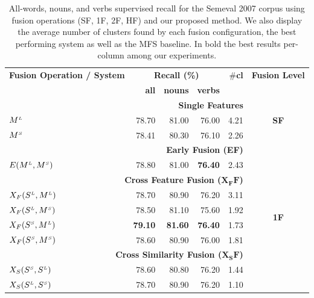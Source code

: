 \begin{table}[htp!]
\centering
\caption{All-words, nouns, and verbs supervised recall for the Semeval 2007 corpus using fusion operations (SF, 1F, 2F, HF) and our proposed method. We also display the average number of clusters found by each fusion configuration, the best performing system as well as the MFS baseline. In bold the best results per-column among our experiments.}
\label{tab:sem2007_PM_Recall}
\begin{tabular}{@{}lrrrrc@{}}
\toprule
\textbf{Fusion Operation / System} & \multicolumn{3}{c}{\textbf{Recall (\%)}} & \#\textbf{cl} & \textbf{Fusion Level}\\ 
        & \textbf{all}          & \textbf{nouns}          & \textbf{verbs} &          \\ 
       \midrule
        \multicolumn{5}{r}{\textbf{Single Features}} & \multirow{3}{*}{\textbf{SF}} \\ %
       $M^{\scriptscriptstyle L}$                    & 78.70 & 81.00 & 76.00 & 4.21\\
 

       $M^{\scriptscriptstyle S}$                    & 78.41 & 80.30 & 76.10 & 2.26\\
       \midrule
                   \multicolumn{5}{r}{\textbf{Early Fusion (EF)}}  & \multirow{10}{*}{\textbf{1F}}     \\ %
       $E(M^{\scriptscriptstyle L}, M^{\scriptscriptstyle S})$		& 78.80 & 81.00 & \textbf{76.40} & 2.43\\
                   \multicolumn{5}{r}{\textbf{Cross Feature Fusion ($\mathbf{X_FF}$)}}       \\ %
	   
	   $X_F(S^{\scriptscriptstyle L}, M^{\scriptscriptstyle L})$		& 78.70 & 80.90 & 76.20  & 3.11\\	   
       $X_F(S^{\scriptscriptstyle L}, M^{\scriptscriptstyle S})$		& 78.50 & 81.10 & 75.60  & 1.92\\
	   $X_F(S^{\scriptscriptstyle S}, M^{\scriptscriptstyle L})$		& \textbf{79.10} & \textbf{81.60} & \textbf{76.40}  & 1.73\\	   
       $X_F(S^{\scriptscriptstyle S}, M^{\scriptscriptstyle S})$		& 78.60 		 & 80.90  & 76.00 & 1.81\\       
                   \multicolumn{5}{r}{\textbf{Cross Similarity Fusion ($\mathbf{X_SF}$)}}       \\ %
	   
 
	   $X_S(S^{\scriptscriptstyle S}, S^{\scriptscriptstyle L})$		& 78.60 & 80.80 & 76.20  & 1.44\\
	   $X_S(S^{\scriptscriptstyle L}, S^{\scriptscriptstyle S})$		& 78.70 & 80.90	& 76.20 & 1.10\\
	  

\end{tabular}
\end{table}
